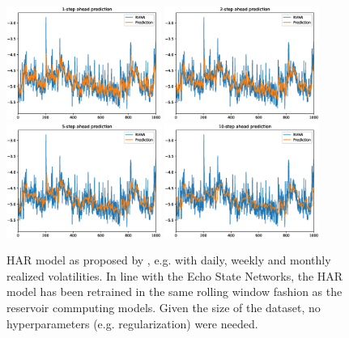 \begin{figure}
    \begin{center}
        \includegraphics[width=0.45\textwidth]{Plots/Prediction/HAR_rolling_1step.eps}
        \includegraphics[width=0.45\textwidth]{Plots/Prediction/HAR_rolling_2step.eps} \\
        \includegraphics[width=0.45\textwidth]{Plots/Prediction/HAR_rolling_5step.eps}
        \includegraphics[width=0.45\textwidth]{Plots/Prediction/HAR_rolling_10step.eps}
    \end{center}
    \caption{HAR model as proposed by \cite{Corsi2009}, e.g. with daily, weekly and monthly realized volatilities. In line with the Echo State Networks, the HAR model has been retrained in the same rolling window fashion as the reservoir commputing models. Given the size of the dataset, no hyperparameters (e.g. regularization) were needed.}
    \label{FIG:HARRolling}
\end{figure}


